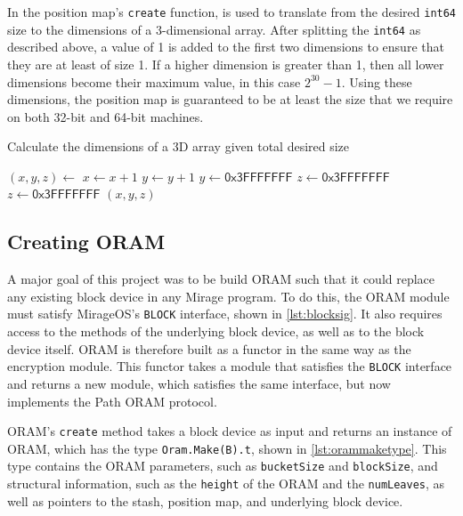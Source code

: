 \documentclass[12pt,a4paper,twoside,openright]{report}
\begin{document}
In the position map's \texttt{create} function,  is used to translate from the desired \texttt{int64} size to the dimensions of a 3-dimensional array. After splitting the \texttt{int64} as described above, a value of 1 is added to the first two dimensions to ensure that they are at least of size 1. If a higher dimension is greater than 1, then all lower dimensions become their maximum value, in this case $2^{30}-1$. Using these dimensions, the position map is guaranteed to be at least the size that we require on both 32-bit and 64-bit machines.

\begin{algorithm}[t]
\caption{Calculate the dimensions of a 3D array given total desired size}
\label{alg:posmapdims}
\footnotesize
\begin{algorithmic}[1]
\vskip 10pt
\vskip 10pt
\vskip 10pt
    \State $(x, y, z) \gets$ 
\vskip 10pt
    \State $x \gets x + 1$
    \State $y \gets y + 1$
\vskip 10pt
        \State $y \gets \mathsf{0x3FFFFFFF}$
        \State $z \gets \mathsf{0x3FFFFFFF}$
        \State $z \gets \mathsf{0x3FFFFFFF}$
    \EndIf
\vskip 10pt
    \State \Return $(x,y,z)$
\vskip 10pt
\EndFunction
\vskip 10pt
\end{algorithmic}
\end{algorithm}

\subsection{Creating ORAM}

A major goal of this project was to be build ORAM such that it could replace any existing block device in any Mirage program. To do this, the ORAM module must satisfy MirageOS's \texttt{BLOCK} interface, shown in \cref{lst:blocksig}. It also requires access to the methods of the underlying block device, as well as to the block device itself. ORAM is therefore built as a functor in the same way as the encryption module. This functor takes a module that satisfies the \texttt{BLOCK} interface and returns a new module, which satisfies the same interface, but now implements the Path ORAM protocol.

ORAM's \texttt{create} method takes a block device as input and returns an instance of ORAM, which has the type \texttt{Oram.Make(B).t}, shown in \cref{lst:orammaketype}. This type contains the ORAM parameters, such as \texttt{bucketSize} and \texttt{blockSize}, and  structural information, such as the \texttt{height} of the ORAM and the \texttt{numLeaves}, as well as pointers to the stash, position map, and underlying block device.
\end{document}
